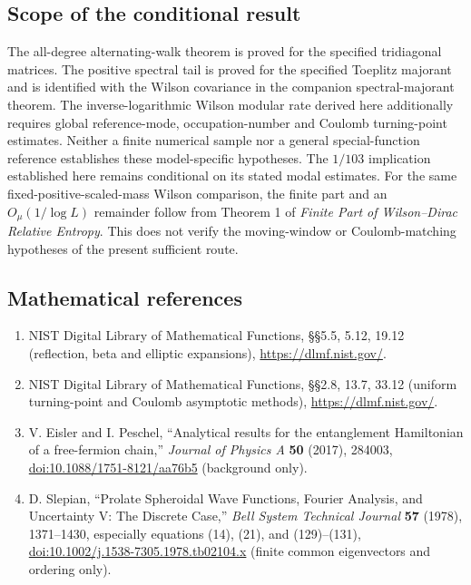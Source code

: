 \documentclass[
  10pt,
  a4paper,
]{article}
\providecommand{\tightlist}{%
  \setlength{\itemsep}{0pt}\setlength{\parskip}{0pt}}
\begin{document}
\subsection{Scope of the conditional result}\label{scope-of-the-conditional-result}

The all-degree alternating-walk theorem is proved for the specified tridiagonal matrices. The positive spectral tail is proved for the specified Toeplitz majorant and is identified with the Wilson covariance in the companion spectral-majorant theorem. The inverse-logarithmic Wilson modular rate derived here additionally requires global reference-mode, occupation-number and Coulomb turning-point estimates. Neither a finite numerical sample nor a general special-function reference establishes these model-specific hypotheses. The \(1/103\) implication established here remains conditional on its stated modal estimates. For the same fixed-positive-scaled-mass Wilson comparison, the finite part and an \(O_\mu(1/\log L)\) remainder follow from Theorem 1 of \emph{Finite Part of Wilson--Dirac Relative Entropy}. This does not verify the moving-window or Coulomb-matching hypotheses of the present sufficient route.

\subsection{Mathematical references}\label{mathematical-references}

\begin{enumerate}
\def\labelenumi{\arabic{enumi}.}
\tightlist
\item
  NIST Digital Library of Mathematical Functions, §§5.5, 5.12, 19.12 (reflection, beta and elliptic expansions), \url{https://dlmf.nist.gov/}.
\item
  NIST Digital Library of Mathematical Functions, §§2.8, 13.7, 33.12 (uniform turning-point and Coulomb asymptotic methods), \url{https://dlmf.nist.gov/}.
\item
  V. Eisler and I. Peschel, ``Analytical results for the entanglement Hamiltonian of a free-fermion chain,'' \emph{Journal of Physics A} \textbf{50} (2017), 284003, \url{doi:10.1088/1751-8121/aa76b5} (background only).
\item
  D. Slepian, ``Prolate Spheroidal Wave Functions, Fourier Analysis, and Uncertainty V: The Discrete Case,'' \emph{Bell System Technical Journal} \textbf{57} (1978), 1371--1430, especially equations (14), (21), and (129)--(131), \url{doi:10.1002/j.1538-7305.1978.tb02104.x} (finite common eigenvectors and ordering only).
\end{enumerate}
\end{document}
